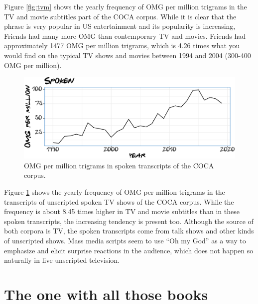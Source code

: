 \documentclass[]{article}
\begin{document}
\newpage

Figure \ref{fig:tvm} shows the yearly frequency of OMG per million trigrams in the TV and movie subtitles part of the COCA corpus. While it is clear that the phrase is very popular in US entertainment and its popularity is increasing, Friends had many more OMG than contemporary TV and movies. Friends had approximately 1477 OMG per million trigrams, which is 4.26 times what you would find on the typical TV shows and movies between 1994 and 2004 (300-400 OMG per million).

\begin{figure}

{\centering \includegraphics{Friends_HPS_pdf_files/figure-latex/spoken-1} 

}

\caption{OMG per million trigrams in spoken transcripts of the COCA corpus.}\label{fig:spoken}
\end{figure}

Figure \ref{fig:spoken} shows the yearly frequency of OMG per million trigrams in the transcripts of unscripted spoken TV shows of the COCA corpus. While the frequency is about 8.45 times higher in TV and movie subtitles than in these spoken transcripts, the increasing tendency is present too. Although the source of both corpora is TV, the spoken transcripts come from talk shows and other kinds of unscripted shows. Mass media scripts seem to use ``Oh my God'' as a way to emphasize and elicit surprise reactions in the audience, which does not happen so naturally in live unscripted television.

\newpage

\hypertarget{the-one-with-all-those-books}{%
\section{The one with all those books}\label{the-one-with-all-those-books}}
\end{document}
